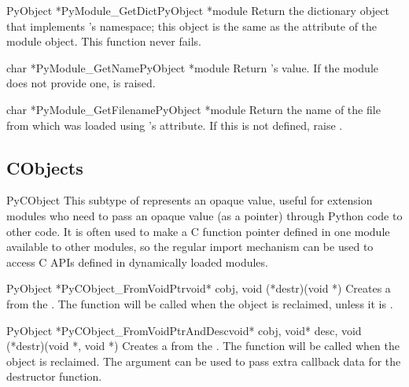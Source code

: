 \documentclass{manual}
\begin{document}
\begin{cfuncdesc}{PyObject *}{PyModule_GetDict}{PyObject *module}
Return the dictionary object that implements 's namespace; 
this object is the same as the  attribute of the
module object.  This function never fails.
\end{cfuncdesc}

\begin{cfuncdesc}{char *}{PyModule_GetName}{PyObject *module}
Return 's  value.  If the module does not 
provide one,  is raised.
\end{cfuncdesc}

\begin{cfuncdesc}{char *}{PyModule_GetFilename}{PyObject *module}
Return the name of the file from which  was loaded using
's  attribute.  If this is not defined,
raise .
\end{cfuncdesc}


\subsection{CObjects \label{cObjects}}

\begin{ctypedesc}{PyCObject}
This subtype of  represents an opaque value, useful for
\C{} extension modules who need to pass an opaque value (as a
 pointer) through Python code to other \C{} code.  It is
often used to make a C function pointer defined in one module
available to other modules, so the regular import mechanism can be
used to access C APIs defined in dynamically loaded modules.
\end{ctypedesc}

\begin{cfuncdesc}{PyObject *}{PyCObject_FromVoidPtr}{void* cobj, 
	void (*destr)(void *)}
Creates a  from the  .  The
 function will be called when the object is reclaimed, unless
it is \NULL.
\end{cfuncdesc}

\begin{cfuncdesc}{PyObject *}{PyCObject_FromVoidPtrAndDesc}{void* cobj,
	void* desc, void (*destr)(void *, void *) }
Creates a  from the .  The
 function will be called when the object is reclaimed.  The
 argument can be used to pass extra callback data for the
destructor function.
\end{cfuncdesc}
\end{document}
